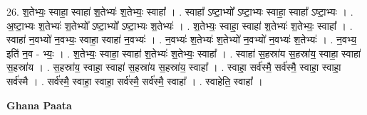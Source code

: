 \documentclass[17pt]{extarticle}
\begin{document}
26. श॒तेभ्यः॒ स्वाहा॒ स्वाहा॑ श॒तेभ्यः॑ श॒तेभ्यः॒ स्वाहा᳚ । . स्वाहा᳚ ऽष्टा॒भ्यो᳚ ऽष्टा॒भ्यः स्वाहा॒ स्वाहा᳚ ऽष्टा॒भ्यः । . अ॒ष्टा॒भ्यः श॒तेभ्यः॑ श॒तेभ्यो᳚ ऽष्टा॒भ्यो᳚ ऽष्टा॒भ्यः श॒तेभ्यः॑ । . श॒तेभ्यः॒ स्वाहा॒ स्वाहा॑ श॒तेभ्यः॑ श॒तेभ्यः॒ स्वाहा᳚ । . स्वाहा॑ न॒वभ्यो॑ न॒वभ्यः॒ स्वाहा॒ स्वाहा॑ न॒वभ्यः॑ । . न॒वभ्यः॑ श॒तेभ्यः॑ श॒तेभ्यो॑ न॒वभ्यो॑ न॒वभ्यः॑ श॒तेभ्यः॑ । . न॒वभ्य॒ इति॑ न॒व - भ्यः॒ । . श॒तेभ्यः॒ स्वाहा॒ स्वाहा॑ श॒तेभ्यः॑ श॒तेभ्यः॒ स्वाहा᳚ । . स्वाहा॑ स॒हस्रा॑य स॒हस्रा॑य॒ स्वाहा॒ स्वाहा॑ स॒हस्रा॑य । . स॒हस्रा॑य॒ स्वाहा॒ स्वाहा॑ स॒हस्रा॑य स॒हस्रा॑य॒ स्वाहा᳚ । . स्वाहा॒ सर्व॑स्मै॒ सर्व॑स्मै॒ स्वाहा॒ स्वाहा॒ सर्व॑स्मै । . सर्व॑स्मै॒ स्वाहा॒ स्वाहा॒ सर्व॑स्मै॒ सर्व॑स्मै॒ स्वाहा᳚ । . स्वाहेति॒ स्वाहा᳚ । \newline

\textbf{Ghana Paata } \newline
\end{document}
